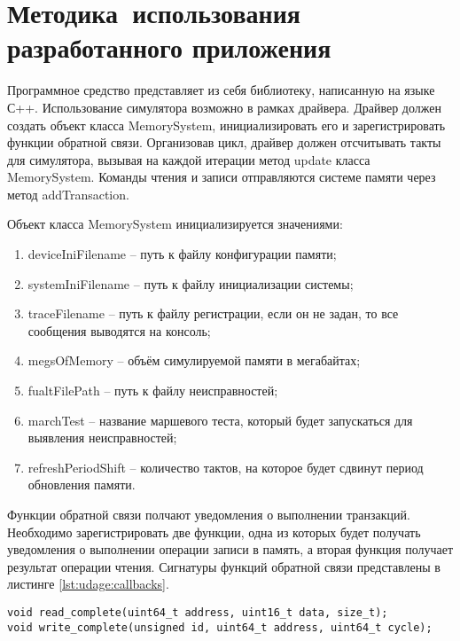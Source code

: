 \section{Методика~использования\\ разработанного приложения}
\label{sec:usage}

Программное средство представляет из себя библиотеку, написанную на языке С++. Использование симулятора возможно в рамках драйвера. Драйвер должен создать объект класса MemorySystem, инициализировать его и зарегистрировать функции обратной связи. Организовав цикл, драйвер должен отсчитывать такты для симулятора, вызывая на каждой итерации метод update класса MemorySystem. Команды чтения и записи отправляются системе памяти через метод addTransaction.

Объект класса MemorySystem инициализируется значениями:

\begin{enumerate}
\item deviceIniFilename -- путь к файлу конфигурации памяти;
\item systemIniFilename -- путь к файлу инициализации системы;
\item traceFilename -- путь к файлу регистрации, если он не задан, то все сообщения выводятся на консоль;
\item megsOfMemory -- объём симулируемой памяти в мегабайтах;
\item fualtFilePath -- путь к файлу неисправностей;
\item marchTest -- название маршевого теста, который будет запускаться для выявления неисправностей;
\item refreshPeriodShift -- количество тактов, на которое будет сдвинут период обновления памяти.
\end{enumerate}

Функции обратной связи полчают уведомления о выполнении транзакций. Необходимо зарегистрировать две функции, одна из которых будет получать уведомления о выполнении операции записи в память, а вторая функция получает результат операции чтения. Сигнатуры функций обратной связи представлены в листинге \ref{lst:udage:callbacks}.

\begin{lstlisting}[style=cplusplusstyle, caption={Сигнатуры функций обратного вызова}, label=lst:udage:callbacks]
void read_complete(uint64_t address, uint16_t data, size_t);
void write_complete(unsigned id, uint64_t address, uint64_t cycle);
\end{lstlisting}

